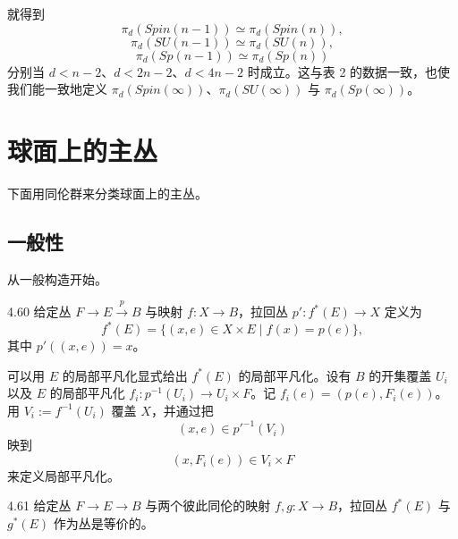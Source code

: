 就得到
\begin{equation}
\pi_d(Spin(n-1))\simeq\pi_d(Spin(n)),
\tag{4.61}
\end{equation}
\begin{equation}
\pi_d(SU(n-1))\simeq\pi_d(SU(n)),
\tag{4.62}
\end{equation}
\begin{equation}
\pi_d(Sp(n-1))\simeq\pi_d(Sp(n))
\tag{4.63}
\end{equation}
分别当 $d<n-2$、$d<2n-2$、$d<4n-2$ 时成立。这与表 2 的数据一致，也使我们能一致地定义 $\pi_d(Spin(\infty))$、$\pi_d(SU(\infty))$ 与 $\pi_d(Sp(\infty))$。


\section{球面上的主丛}

下面用同伦群来分类球面上的主丛。

\subsection{一般性}

从一般构造开始。

\begin{definition}{4.60}
给定丛 $F\to E\xrightarrow{p}B$ 与映射 $f:X\to B$，拉回丛 $p':f^*(E)\to X$ 定义为
\begin{equation}
f^*(E)=\{(x,e)\in X\times E\mid f(x)=p(e)\},
\tag{4.64}
\end{equation}
其中 $p'((x,e))=x$。
\end{definition}

可以用 $E$ 的局部平凡化显式给出 $f^*(E)$ 的局部平凡化。设有 $B$ 的开集覆盖 $U_i$ 以及 $E$ 的局部平凡化 $f_i:p^{-1}(U_i)\to U_i\times F$。记 $f_i(e)=(p(e),F_i(e))$。用 $V_i:=f^{-1}(U_i)$ 覆盖 $X$，并通过把
\begin{equation}
(x,e)\in p'^{-1}(V_i)
\tag{4.65}
\end{equation}
映到
\begin{equation}
(x,F_i(e))\in V_i\times F
\tag{4.66}
\end{equation}
来定义局部平凡化。

\begin{theorem}{4.61}
给定丛 $F\to E\to B$ 与两个彼此同伦的映射 $f,g:X\to B$，拉回丛 $f^*(E)$ 与 $g^*(E)$ 作为丛是等价的。
\end{theorem}

